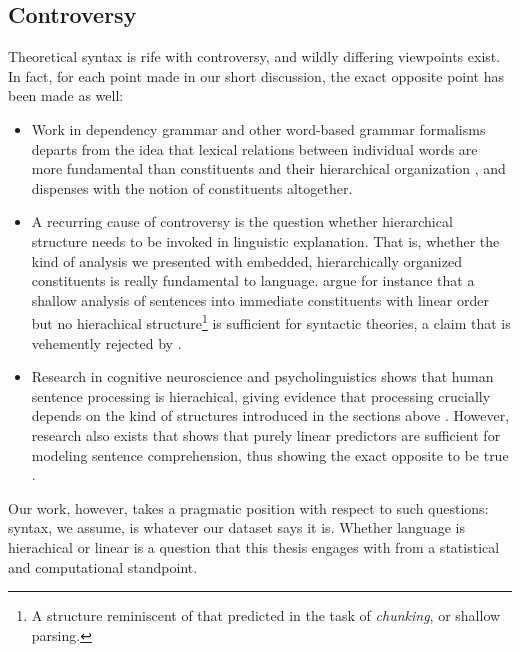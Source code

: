 \subsection{Controversy}
Theoretical syntax is rife with controversy, and wildly differing viewpoints exist. In fact, for each point made in our short discussion, the exact opposite point has been made as well:

\begin{itemize}
  \item Work in dependency grammar and other word-based grammar formalisms departs from the idea that lexical relations between individual words are more fundamental than constituents and their hierarchical organization \citep{tesniere1959elements,nivre2005dependency,hudson2010introduction}, and dispenses with the notion of constituents altogether.

  \item A recurring cause of controversy is the question whether hierarchical structure needs to be invoked in linguistic explanation. That is, whether the kind of analysis we presented with embedded, hierarchically organized constituents is really fundamental to language. \citet{frank2012hierarchical} argue for instance that a shallow analysis of sentences into immediate constituents with linear order but no hierachical structure\footnote{A structure reminiscent of that predicted in the task of \textit{chunking}, or shallow parsing.} is sufficient for syntactic theories, a claim that is vehemently rejected by \citet{everaert2015structures}.

  \item Research in cognitive neuroscience and psycholinguistics shows that human sentence processing is hierachical, giving evidence that processing crucially depends on the kind of structures introduced in the sections above \citep{hale2001earley,levy2008expectation,brennan2016abstract}. However, research also exists that shows that purely linear predictors are sufficient for modeling sentence comprehension, thus showing the exact opposite to be true \citep{conway2008neurocognitive,gillespie2011hierarchy,christiansen2012similar,gillespie2013against,frank2012hierarchical}.
\end{itemize}
Our work, however, takes a pragmatic position with respect to such questions: syntax, we assume, is whatever our dataset says it is. Whether language is hierachical or linear is a question that this thesis engages with from a statistical and computational standpoint.

